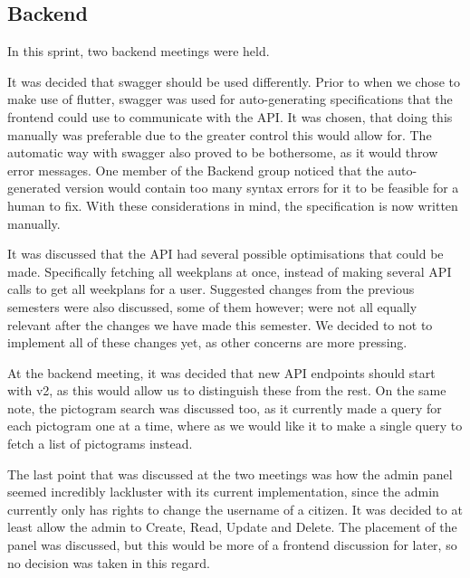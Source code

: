 \subsection{Backend}
In this sprint, two backend meetings were held.

It was decided that swagger should be used differently.
Prior to when we chose to make use of flutter, swagger was used for auto-generating specifications that the frontend could use to communicate with the API.
It was chosen, that doing this manually was preferable due to the greater control this would allow for.
The automatic way with swagger also proved to be bothersome, as it would throw error messages.
One member of the Backend group noticed that the auto-generated version would contain too many syntax errors for it to be feasible for a human to fix.
With these considerations in mind, the specification is now written manually.

It was discussed that the API had several possible optimisations that could be made.
Specifically fetching all weekplans at once, instead of making several API calls to get all weekplans for a user.
Suggested changes from the previous semesters were also discussed, some of them however; were not all equally relevant after the changes we have made this semester.
We decided to not to implement all of these changes yet, as other concerns are more pressing.

At the backend meeting, it was decided that new API endpoints should start with v2, as this would allow us to distinguish these from the rest.
On the same note, the pictogram search was discussed too, as it currently made a query for each pictogram one at a time, where as we would like it to make a single query to fetch a list of pictograms instead.

The last point that was discussed at the two meetings was how the admin panel seemed incredibly lackluster with its current implementation, since the admin currently only has rights to change the username of a citizen. It was decided to at least allow the admin to Create, Read, Update and Delete. The placement of the panel was discussed, but this would be more of a frontend discussion for later, so no decision was taken in this regard.

